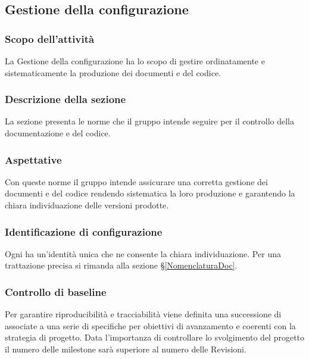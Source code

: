 \subsection{Gestione della configurazione}
\subsubsection{Scopo dell'attività} \label{PSup_GestioneConf_Scopo}
La Gestione della configurazione ha lo scopo di gestire ordinatamente e sistematicamente la produzione dei documenti e del codice.

\subsubsection{Descrizione della sezione} 
La sezione presenta le norme che il gruppo intende seguire per il controllo della documentazione e del codice.

\subsubsection{Aspettative}
Con queste norme il gruppo intende assicurare una corretta gestione dei documenti e del codice rendendo sistematica la loro produzione e garantendo la chiara individuazione delle versioni prodotte.

\subsubsection{Identificazione di configurazione}
Ogni  ha un'identità unica che ne consente la chiara individuazione. Per una trattazione precisa si rimanda alla sezione \S\ref{NomenclaturaDoc}.

\subsubsection{Controllo di baseline}
Per garantire riproducibilità e tracciabilità viene definita una successione di  associate a una serie di  specifiche per obiettivi di avanzamento e coerenti con la strategia di progetto. Data l'importanza di controllare lo svolgimento del progetto il numero delle milestone sarà superiore al numero delle Revisioni.

